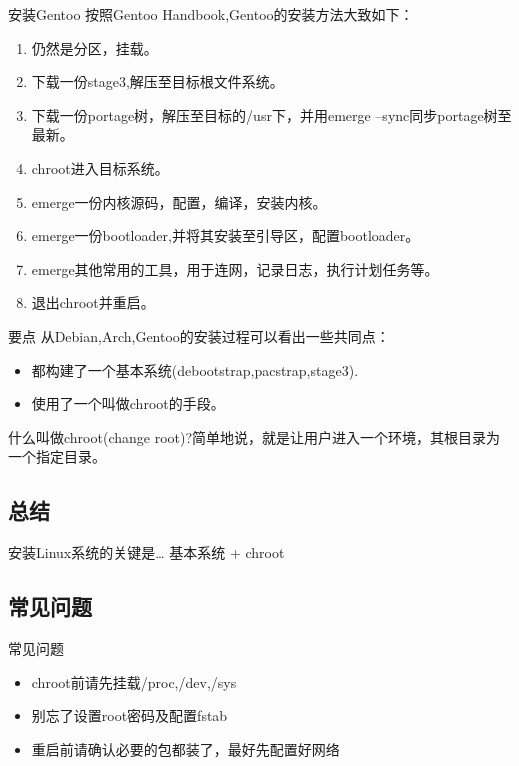 \documentclass{beamer}
\begin{document}
\begin{frame}{安装Gentoo}
按照Gentoo Handbook,Gentoo的安装方法大致如下：
\begin{enumerate}
\item 仍然是分区，挂载。
\item 下载一份stage3,解压至目标根文件系统。
\item 下载一份portage树，解压至目标的/usr下，并用emerge --sync同步portage树至最新。
\item chroot进入目标系统。
\item emerge一份内核源码，配置，编译，安装内核。
\item emerge一份bootloader,并将其安装至引导区，配置bootloader。
\item emerge其他常用的工具，用于连网，记录日志，执行计划任务等。
\item 退出chroot并重启。
\end{enumerate}
\end{frame}

\begin{frame}{要点}
从Debian,Arch,Gentoo的安装过程可以看出一些共同点：
\begin{itemize}
\item 都构建了一个基本系统(debootstrap,pacstrap,stage3).
\item 使用了一个叫做chroot的手段。
\end{itemize}

什么叫做chroot(change root)?简单地说，就是让用户进入一个环境，其根目录为一个指定目录。
\end{frame}

\subsection{总结}
\begin{frame}{安装Linux系统的关键是\ldots}
\Huge 基本系统 + chroot \normalsize
\end{frame}

\subsection{常见问题}
\begin{frame}{常见问题}
\begin{itemize}
\item chroot前请先挂载/proc,/dev,/sys
\item 别忘了设置root密码及配置fstab
\item 重启前请确认必要的包都装了，最好先配置好网络
\end{itemize}
\end{frame}
\end{document}
